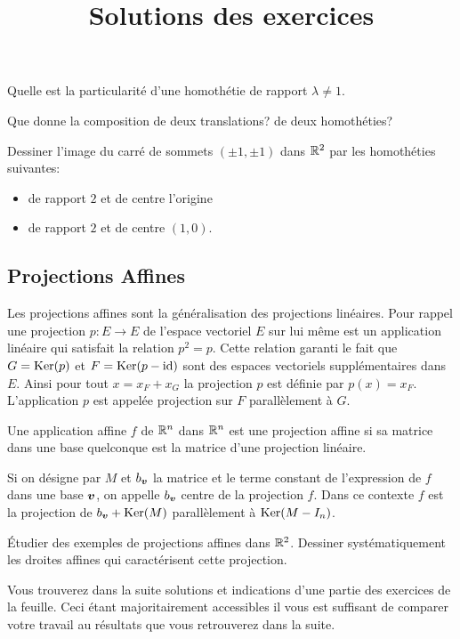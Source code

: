 \documentclass[11pt, a4paper]{article}
\begin{document}
\begin{question}
  Quelle est la particularité d'une homothétie de rapport
  $\lambda \neq 1$.
\end{question}
\begin{question}
  Que donne la composition de deux translations? de deux homothéties?
\end{question}
\begin{question}
  Dessiner l'image du carré de sommets $(\pm 1, \pm 1)$
  dans $\mathbb{R}^2$ par les homothéties suivantes:
  \begin{itemize}
  \item[\textbullet]
    de rapport $2$ et de centre l'origine
  \item[\textbullet]
    de rapport $2$ et de centre $(1, 0)$.
  \end{itemize}
\end{question}

\subsection{Projections Affines}

Les projections affines sont la généralisation des projections
linéaires. Pour rappel une projection $p : E \rightarrow E$ de
l'espace vectoriel $E$ sur lui même est un application linéaire qui
satisfait la relation $p^2 = p$. Cette relation garanti le fait que
$G = \operatorname{Ker}(p)$ et $F = \operatorname{Ker}(p-\mathrm{id})$ sont des espaces vectoriels
supplémentaires dans $E$. Ainsi pour tout $x = x_F + x_G$ la
projection $p$ est définie par $p(x) = x_F$. L'application $p$ est
appelée projection sur $F$ parallèlement à $G$.
\begin{defn}
  Une application affine $f$ de $\mathbb{R}^n$ dans $\mathbb{R}^n$ est une projection
  affine si sa matrice dans une base quelconque est la matrice d'une
  projection linéaire.
\end{defn}
Si on désigne par $M$ et $b_{\boldsymbol{v}}$ la matrice et le terme constant
de l'expression de $f$ dans une base $\boldsymbol{v}$, on appelle $b_{\boldsymbol{v}}$
centre de la projection $f$. Dans ce contexte $f$ est la projection de
$b_{\boldsymbol{v}} + \operatorname{Ker}(M)$ parallèlement à $\operatorname{Ker}(M-I_n)$.

\begin{question}
  Étudier des exemples de projections affines dans $\mathbb{R}^2$. Dessiner
  systématiquement les droites affines qui caractérisent cette
  projection.
\end{question}

\pretitle{\vspace{-2\baselineskip} \begin{center}}
\title{%
  { \huge Solutions des exercices}%
}
\posttitle{
\end{center}
  \vspace{.5\baselineskip}
  \rule{\textwidth}{1.5pt}
  \vspace{-5\baselineskip}
}

\maketitle\thispagestyle{fancy}

\noindent Vous trouverez dans la suite solutions et indications d'une
partie des exercices de la feuille. Ceci étant majoritairement
accessibles il vous est suffisant de comparer votre travail au
résultats que vous retrouverez dans la suite.
\end{document}

